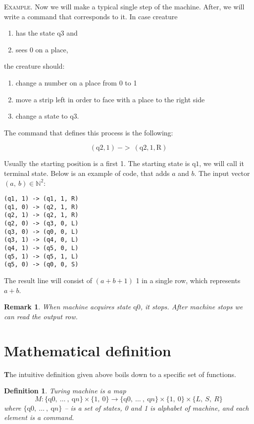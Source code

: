 \documentclass[12pt]{article}
\newcommand\tab[1][-1em]{\hspace*{#1}}
\newtheorem*{remark}{Remark}
\newtheorem{definition}{Definition}[section]
\begin{document}
 \vspace{5mm}
\begin{addmargin}[3em]{3em}
\tab
\textsc{Example.} Now we will make a typical single step of the machine. After, we will write a command that corresponds to it. In case creature
\begin{enumerate}
\item has the state $\mathrm{q}3$ and \item sees 0 on a place,
\end{enumerate}
the creature should: 
\begin{enumerate}
\item change a number on a place from 0 to 1 \item move a strip left in order to face with a place to the right side \item change a state to $\mathrm{q}3$. 
\end{enumerate}


The command that defines this process is the following:

{\large $$(\mathrm{q}2, 1)\ ->\ (\mathrm{q}2, 1, \mathrm{R})$$}
\end{addmargin}
Usually the starting position is a first 1. The starting state is $\mathrm{q}1$, we will call it terminal state.
Below is an example of code, that adds $a$ and $b$. The input vector $(a,\ b)\in\mathbb{N}^2$:

\begin{lstlisting}
(q1, 1) -> (q1, 1, R)
(q1, 0) -> (q2, 1, R)
(q2, 1) -> (q2, 1, R)
(q2, 0) -> (q3, 0, L)
(q3, 0) -> (q0, 0, L)
(q3, 1) -> (q4, 0, L)
(q4, 1) -> (q5, 0, L)
(q5, 1) -> (q5, 1, L)
(q5, 0) -> (q0, 0, S)
\end{lstlisting}

The result line will consist of $(a+b+1)$ 1 in a single row, which represents $a+b$.
\begin{remark} When machine acquires state $\mathrm{q}0$, it stops. After machine stops we can read the output row.
\end{remark}

\section{Mathematical definition}
\textbf{\large T}he intuitive definition given above boils down to a specific set of functions. 
\begin{definition}
Turing machine is a map
$$ M:\{\mathrm{q}0,\ \dots\ ,\ \mathrm{q}n\} \times \{ 1,\ 0\} \rightarrow \{\mathrm{q}0,\ \dots\ ,\ \mathrm{q}n\} \times \{ 1,\ 0\} \times \{L,\ S,\ R\}$$
where $\{\mathrm{q}0,\ \dots\ ,\ \mathrm{q}n\}$ -- is a set of states, 0 and 1 is alphabet of machine, and each element is a command.
\end{definition}
\end{document}
